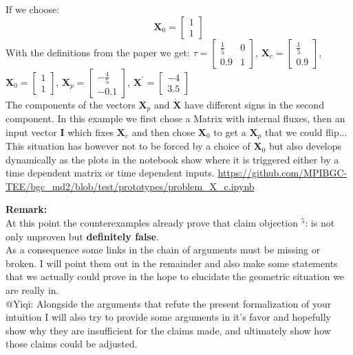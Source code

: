 \documentclass{article}
\newcommand{\om}[1]{{\color{red} objection $^{#1}$}: }
\newcommand{\X}{\mathbf{X}}
\begin{document}
\begin{enumerate}
$$    $$
    If we choose: 
    $$
    \X_0=\left[\begin{matrix}1\\1\end{matrix}\right] 
    $$
    With the definitions from the paper we get:
    $\tau=\left[\begin{matrix}\frac{1}{5} & 0\\0.9 & 1\end{matrix}\right]$,
    $\X_c=\left[\begin{matrix}\frac{1}{5}\\0.9\end{matrix}\right]$,
    $\X_0=\left[\begin{matrix}1\\1\end{matrix}\right]$,
    $\X_p=\left[\begin{matrix}- \frac{4}{5}\\-0.1\end{matrix}\right]$,
    $\X^\prime=\left[\begin{matrix}-4\\3.5\end{matrix}\right]$
    \\
    The components of the vectors $\mathbf{X}_p$ and $\dot{\mathbf{X}}$ have 
    different signs in the second component. 
    In this example we first chose a Matrix with internal fluxes, then an input vector $\mathbf{I}$ which fixes $\X_c$ and then chose $\X_0$ to get a $\X_p$ that we could flip...
    This situation has however not to be forced by a choice of $\X_0$ but also develops dynamically as the plots in the notebook show where it is triggered either by a 
    time dependent matrix or time dependent inputs.  
    \url{https://github.com/MPIBGC-TEE/bgc_md2/blob/test/prototypes/problem_X_c.ipynb}

    {\bf 
    Remark:\\
    }
    At this point the counterexamples already prove that claim \om{5} is not only unproven but 
    {\bf definitely false}. \\
    As a consequence some links in the chain of arguments must be missing or broken.
    I will point them out in the remainder and also make some statements that we actually 
    could prove in the hope to elucidate the geometric situation we are really in.
    \\
    @Yiqi: Alongside the arguments that refute the present formalization of your intuition 
    I will also try to provide some arguments in it's favor and hopefully show why they are insufficient for the claims made, and ultimately show how those claims could be adjusted.
    

\end{enumerate}
\end{document}
